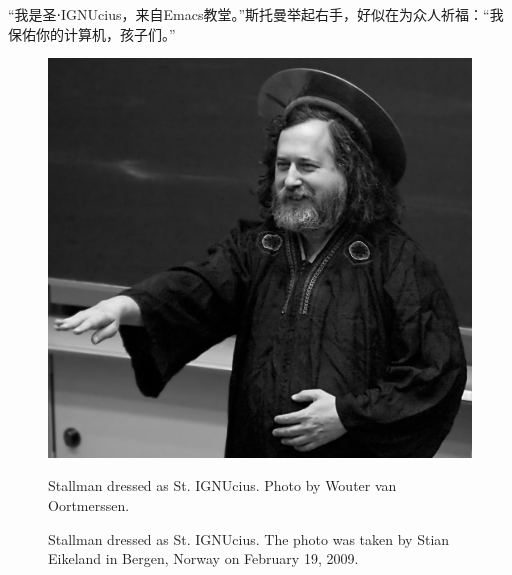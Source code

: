 \ifdefined\chs
``我是圣⋅IGNUcius，来自Emacs教堂。''斯托曼举起右手，好似在为众人祈福：``我保佑你的计算机，孩子们。''
\fi

\ifdefined\eng
\begin{figure}[ht] \centering
  \includegraphics[width=\textwidth]{stignucius}
  \ifdefined\vone
  \caption{Stallman dressed as St. IGNUcius. Photo by Wouter van Oortmerssen.}
  \fi
  \ifdefined\vtwo
  \caption{Stallman dressed as St. IGNUcius. The photo was taken by Stian Eikeland in Bergen, Norway on February 19, 2009.}
  \fi
\end{figure}
\fi

